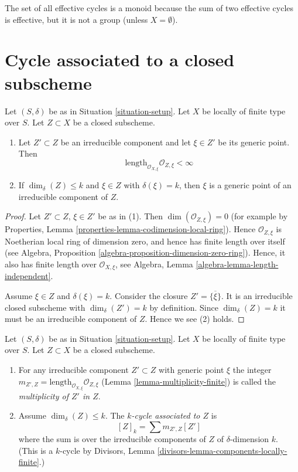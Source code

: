 \noindent
The set of all effective cycles is a monoid because the sum of
two effective cycles is effective, but it is not a group
(unless $X = \emptyset$).




\section{Cycle associated to a closed subscheme}
\label{section-cycle-of-closed-subscheme}

\begin{lemma}
\label{lemma-multiplicity-finite}
Let $(S, \delta)$ be as in Situation \ref{situation-setup}.
Let $X$ be locally of finite type over $S$.
Let $Z \subset X$ be a closed subscheme.
\begin{enumerate}
\item Let $Z' \subset Z$ be an irreducible component and
let $\xi \in Z'$ be its generic point.
Then
$$
\text{length}_{\mathcal{O}_{X, \xi}} \mathcal{O}_{Z, \xi} < \infty
$$
\item If $\dim_\delta(Z) \leq k$ and $\xi \in Z$ with
$\delta(\xi) = k$, then $\xi$ is a generic point of an
irreducible component of $Z$.
\end{enumerate}
\end{lemma}

\begin{proof}
Let $Z' \subset Z$, $\xi \in Z'$ be as in (1).
Then $\dim(\mathcal{O}_{Z, \xi}) = 0$ (for example by
Properties, Lemma \ref{properties-lemma-codimension-local-ring}).
Hence $\mathcal{O}_{Z, \xi}$ is Noetherian
local ring of dimension zero, and hence has finite length over
itself (see
Algebra, Proposition \ref{algebra-proposition-dimension-zero-ring}).
Hence, it also has finite length over $\mathcal{O}_{X, \xi}$, see
Algebra, Lemma \ref{algebra-lemma-length-independent}.

\medskip\noindent
Assume $\xi \in Z$ and $\delta(\xi) = k$.
Consider the closure $Z' = \overline{\{\xi\}}$. It is an irreducible
closed subscheme with $\dim_\delta(Z') = k$ by definition.
Since $\dim_\delta(Z) = k$ it must be an irreducible component
of $Z$. Hence we see (2) holds.
\end{proof}

\begin{definition}
\label{definition-cycle-associated-to-closed-subscheme}
Let $(S, \delta)$ be as in Situation \ref{situation-setup}.
Let $X$ be locally of finite type over $S$.
Let $Z \subset X$ be a closed subscheme.
\begin{enumerate}
\item For any irreducible component $Z' \subset Z$ with generic point $\xi$
the integer
$m_{Z', Z} = \text{length}_{\mathcal{O}_{X, \xi}} \mathcal{O}_{Z, \xi}$
(Lemma \ref{lemma-multiplicity-finite})
is called the {\it multiplicity of $Z'$ in $Z$}.
\item Assume $\dim_\delta(Z) \leq k$.
The {\it $k$-cycle associated to $Z$} is
$$
[Z]_k
=
\sum m_{Z', Z}[Z']
$$
where the sum is over the irreducible components of $Z$
of $\delta$-dimension $k$. (This is a $k$-cycle by
Divisors, Lemma \ref{divisors-lemma-components-locally-finite}.)
\end{enumerate}
\end{definition}

